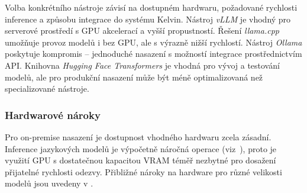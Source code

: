\begin{table}[H]
    \centering
    \caption{Srovnání nástrojů pro on-premise provoz jazykových modelů}
    \label{tab:onpremise-tools-comparison}
\end{table}

Volba konkrétního nástroje závisí na dostupném hardwaru, požadované rychlosti inference a způsobu integrace do systému Kelvin.
Nástroj \textit{vLLM} je vhodný pro serverové prostředí s GPU akcelerací a vyšší propustností.
Řešení \textit{llama.cpp} umožňuje provoz modelů i bez GPU, ale s výrazně nižší rychlostí.
Nástroj \textit{Ollama} poskytuje kompromis -- jednoduché nasazení s možností integrace prostřednictvím API\@.
Knihovna \textit{Hugging Face Transformers} je vhodná pro vývoj a testování modelů, ale pro produkční nasazení může být méně optimalizovaná než specializované nástroje.

\subsubsection*{Hardwarové nároky}
\label{subsubsec:deployment-on-premise-hardware}

Pro on-premise nasazení je dostupnost vhodného hardwaru zcela zásadní.
Inference jazykových modelů je výpočetně náročná operace (viz~), proto je využití GPU s dostatečnou kapacitou VRAM téměř nezbytné pro dosažení přijatelné rychlosti odezvy.
Přibližné nároky na hardware pro různé velikosti modelů jsou uvedeny v .

